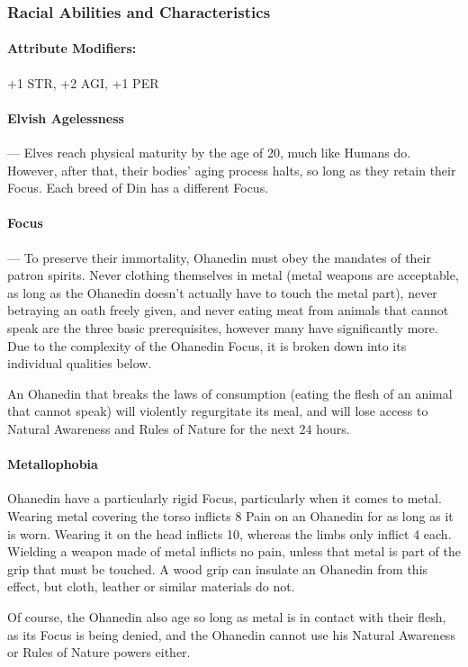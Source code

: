 \documentclass[oneside,11pt,english]{book}
\begin{document}
\subsubsection*{Racial Abilities and Characteristics} 
\paragraph{Attribute Modifiers:} +1 STR, +2 AGI, +1 PER 
\paragraph{Elvish Agelessness}---\quad
Elves reach physical maturity by the age of 20, much like Humans do. However, after that, their bodies' aging process halts, so long as they retain their Focus. Each breed of Din has a different Focus. 
\paragraph{Focus}---\quad
To preserve their immortality, Ohanedin must obey the mandates of their patron spirits. Never clothing themselves in metal (metal weapons are acceptable, as long as the Ohanedin doesn't actually have to touch the metal part), never betraying an oath freely given, and never eating meat from animals that cannot speak are the three basic prerequisites, however many have significantly more. Due to the complexity of the Ohanedin Focus, it is broken down into its individual qualities below. 

An Ohanedin that breaks the laws of consumption (eating the flesh of an animal that cannot speak) will violently regurgitate its meal, and will lose access to Natural Awareness and Rules of Nature for the next 24 hours.
\paragraph{Metallophobia}
Ohanedin have a particularly rigid Focus, particularly when it comes to metal. Wearing metal 
covering the torso inflicts 8 Pain on an Ohanedin for as long as it is worn. Wearing it on the head 
inflicts 10, whereas the limbs only inflict 4 each. Wielding a weapon made of metal inflicts no 
pain, unless that metal is part of the grip that must be touched. A wood grip can insulate an 
Ohanedin from this effect, but cloth, leather or similar materials do not. 

Of course, the Ohanedin also age so long as metal is in contact with their flesh, as its Focus is 
being denied, and the Ohanedin cannot use his Natural Awareness or Rules of Nature powers 
either.
\end{document}
